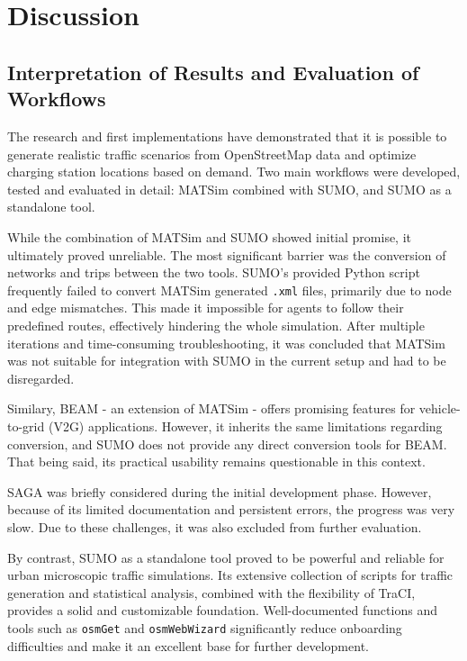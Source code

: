 \section{Discussion}

\subsection{Interpretation of Results and Evaluation of Workflows}
The research and first implementations have demonstrated that it is possible to generate realistic traffic scenarios from OpenStreetMap data and optimize charging station locations based on demand. Two main workflows were developed, tested and evaluated in detail: MATSim combined with SUMO, and SUMO as a standalone tool.

While the combination of MATSim and SUMO showed initial promise, it ultimately proved unreliable. The most significant barrier was the conversion of networks and trips between the two tools. SUMO's provided Python script frequently failed to convert MATSim generated \texttt{.xml} files, primarily due to node and edge mismatches. This made it impossible for agents to follow their predefined routes, effectively hindering the whole simulation. After multiple iterations and time-consuming troubleshooting, it was concluded that MATSim was not suitable for integration with SUMO in the current setup and had to be disregarded.

Similary, BEAM - an extension of MATSim - offers promising features for vehicle-to-grid (V2G) applications. However, it inherits the same limitations regarding conversion, and SUMO does not provide any direct conversion tools for BEAM. That being said, its practical usability remains questionable in this context.

SAGA was briefly considered during the initial development phase. However, because of its limited documentation and persistent errors, the progress was very slow. Due to these challenges, it was also excluded from further evaluation.

By contrast, SUMO as a standalone tool proved to be powerful and reliable for urban microscopic traffic simulations. Its extensive collection of scripts for traffic generation and statistical analysis, combined with the flexibility of TraCI, provides a solid and customizable foundation. Well-documented functions and tools such as \texttt{osmGet} and \texttt{osmWebWizard} significantly reduce onboarding difficulties and make it an excellent base for further development.

